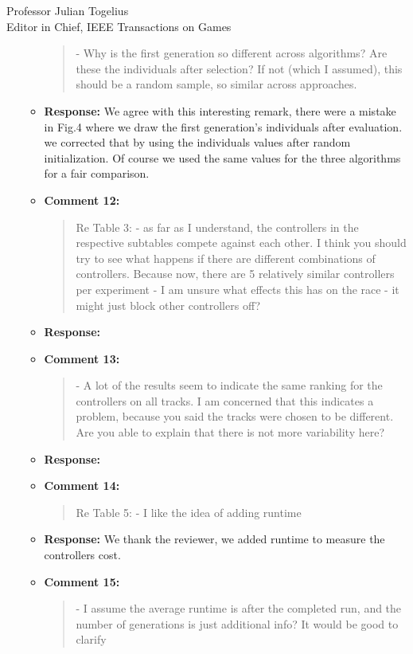 \documentclass[10pt]{letter} %
\begin{document}
\begin{letter}{Professor Julian Togelius \\ Editor in Chief, IEEE Transactions on Games}
\begin{enumerate}
\begin{itemize}
				\begin{quote}	
					- Why is the first generation so different across algorithms? Are these the individuals after selection? If not (which I assumed), this should be a random sample, so similar across approaches.
				\end{quote}	
			\item {\bf Response:} 
			We agree with this interesting remark, there were a mistake in Fig.4 where we draw the first generation's individuals after evaluation.
			we corrected  that by using the individuals values after random initialization. Of course we used the same values for the three algorithms for a fair comparison.
			
			\item {\bf Comment 12:}
				\begin{quote}	
					Re Table 3:
					- as far as I understand, the controllers in the respective subtables compete against each other. I think you should try to see what happens if there are different combinations of controllers. Because now, there are 5 relatively similar controllers per experiment - I am unsure what effects this has on the race - it might just block other controllers off?
				\end{quote}	
			\item {\bf Response:} 
			\item {\bf Comment 13:}
				\begin{quote}	
					- A lot of the results seem to indicate the same ranking for the controllers on all tracks. I am concerned that this indicates a problem, because you said the tracks were chosen to be different. Are you able to explain that there is not more variability here?
				\end{quote}	
			\item {\bf Response:} 
			\item {\bf Comment 14:}
				\begin{quote}	
					Re Table 5:
					- I like the idea of adding runtime
				\end{quote}	
			\item {\bf Response:} 
			We thank the reviewer, we added runtime to measure the controllers cost.
			\item {\bf Comment 15:}
				\begin{quote}	
					- I assume the average runtime is after the completed run, and the number of generations is just additional info? It would be good to clarify

\end{quote}
\end{itemize}
\end{enumerate}
\end{letter}
\end{document}

